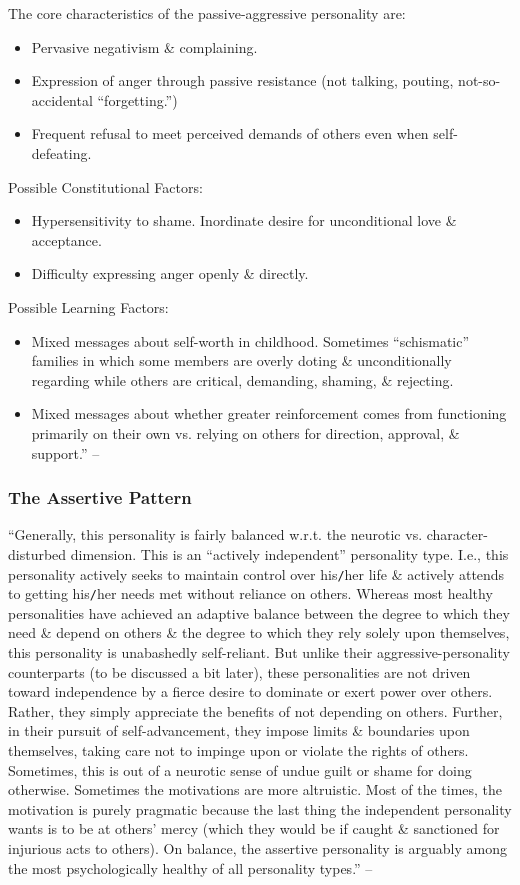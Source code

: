 \documentclass{article}
\numberwithin{equation}{section}
\begin{document}
The core characteristics of the passive-aggressive personality are:
\begin{itemize}
	\item Pervasive negativism \& complaining.
	\item Expression of anger through passive resistance (not talking, pouting, not-so-accidental ``forgetting.'')
	\item Frequent refusal to meet perceived demands of others even when self-defeating.	
\end{itemize}
Possible Constitutional Factors:
\begin{itemize}
	\item Hypersensitivity to shame. Inordinate desire for unconditional love \& acceptance.
	\item Difficulty expressing anger openly \& directly.
\end{itemize}
Possible Learning Factors:
\begin{itemize}
	\item Mixed messages about self-worth in childhood. Sometimes ``schismatic'' families in which some members are overly doting \& unconditionally regarding while others are critical, demanding, shaming, \& rejecting.
	\item Mixed messages about whether greater reinforcement comes from functioning primarily on their own vs. relying on others for direction, approval, \& support.'' -- \cite[pp. 66--69]{Simon2011}
\end{itemize}

\subsubsection{The Assertive Pattern}
``Generally, this personality is fairly balanced w.r.t. the neurotic vs. character-disturbed dimension. This is an ``actively independent'' personality type. I.e., this personality actively seeks to maintain control over his\texttt{/}her life \& actively attends to getting his\texttt{/}her needs met without reliance on others. Whereas most healthy personalities have achieved an adaptive balance between the degree to which they need \& depend on others \& the degree to which they rely solely upon themselves, this personality is unabashedly self-reliant. But unlike their aggressive-personality counterparts (to be discussed a bit later), these personalities are not driven toward independence by a fierce desire to dominate or exert power over others. Rather, they simply appreciate the benefits of not depending on others. Further, in their pursuit of self-advancement, they impose limits \& boundaries upon themselves, taking care not to impinge upon or violate the rights of others. Sometimes, this is out of a neurotic sense of undue guilt or shame for doing otherwise. Sometimes the motivations are more altruistic. Most of the times, the motivation is purely pragmatic because the last thing the independent personality wants is to be at others' mercy (which they would be if caught \& sanctioned for injurious acts to others). On balance, the assertive personality is arguably among the most psychologically healthy of all personality types.'' -- \cite[p. 70]{Simon2011}
\end{document}
